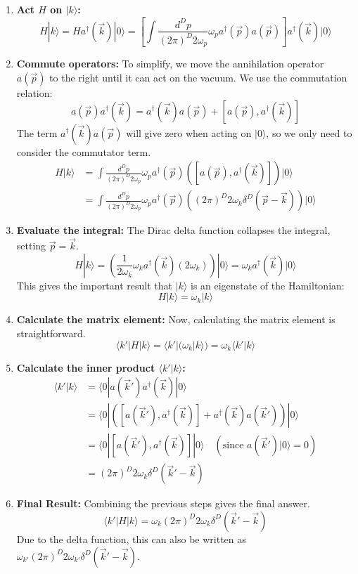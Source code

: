\documentclass[11pt, a4paper]{article}
\begin{document}
\begin{enumerate}
    \item \textbf{Act $H$ on $|k\rangle$:}
    \[ H|k\rangle = H a^\dagger(\vec{k})|0\rangle = \left[ \int \frac{d^Dp}{(2\pi)^D 2\omega_p} \omega_p a^\dagger(\vec{p})a(\vec{p}) \right] a^\dagger(\vec{k})|0\rangle \]

    \item \textbf{Commute operators:} To simplify, we move the annihilation operator $a(\vec{p})$ to the right until it can act on the vacuum. We use the commutation relation:
    \[ a(\vec{p})a^\dagger(\vec{k}) = a^\dagger(\vec{k})a(\vec{p}) + [a(\vec{p}), a^\dagger(\vec{k})] \]
    The term $a^\dagger(\vec{k})a(\vec{p})$ will give zero when acting on $|0\rangle$, so we only need to consider the commutator term.
    \begin{align*}
        H|k\rangle &= \int \frac{d^Dp}{(2\pi)^D 2\omega_p} \omega_p a^\dagger(\vec{p}) \left( [a(\vec{p}), a^\dagger(\vec{k})] \right) |0\rangle \\
        &= \int \frac{d^Dp}{(2\pi)^D 2\omega_p} \omega_p a^\dagger(\vec{p}) \left( (2\pi)^D 2\omega_k \delta^D(\vec{p}-\vec{k}) \right) |0\rangle
    \end{align*}

    \item \textbf{Evaluate the integral:} The Dirac delta function collapses the integral, setting $\vec{p} = \vec{k}$.
    \[ H|k\rangle = \left( \frac{1}{2\omega_k} \omega_k a^\dagger(\vec{k}) (2\omega_k) \right) |0\rangle = \omega_k a^\dagger(\vec{k})|0\rangle \]
    This gives the important result that $|k\rangle$ is an eigenstate of the Hamiltonian:
    \[ H|k\rangle = \omega_k |k\rangle \]

    \item \textbf{Calculate the matrix element:} Now, calculating the matrix element is straightforward.
    \[ \langle k'|H|k\rangle = \langle k'| (\omega_k |k\rangle) = \omega_k \langle k'|k\rangle \]

    \item \textbf{Calculate the inner product $\langle k'|k\rangle$:}
    \begin{align*}
        \langle k'|k\rangle &= \langle 0|a(\vec{k}') a^\dagger(\vec{k})|0\rangle \\
        &= \langle 0| \left( [a(\vec{k}'), a^\dagger(\vec{k})] + a^\dagger(\vec{k})a(\vec{k}') \right) |0\rangle \\
        &= \langle 0| [a(\vec{k}'), a^\dagger(\vec{k})] |0\rangle \quad (\text{since } a(\vec{k}')|0\rangle = 0) \\
        &= (2\pi)^D 2\omega_k \delta^D(\vec{k}'-\vec{k})
    \end{align*}

    \item \textbf{Final Result:} Combining the previous steps gives the final answer.
    \[ \langle k'|H|k\rangle = \omega_k (2\pi)^D 2\omega_k \delta^D(\vec{k}'-\vec{k}) \]
    Due to the delta function, this can also be written as $\omega_{k'} (2\pi)^D 2\omega_{k'} \delta^D(\vec{k}'-\vec{k})$.
\end{enumerate}
\end{document}
